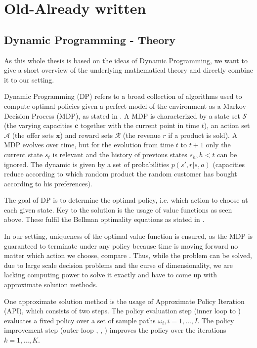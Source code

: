 \clearpage
\section{Old-Already written}

\subsection{Dynamic Programming - Theory}

As this whole thesis is based on the ideas of Dynamic Programming, we want to give a short overview of the underlying mathematical theory and directly combine it to our setting.

Dynamic Programming (DP) refers to a broad collection of algorithms used to compute optimal policies given a perfect model of the environment as a Markov Decision Process (MDP), as stated in \cite{Sutton.2018}. A MDP is characterized by a state set $\mathcal{S}$ (the varying capacities $\mathbf{c}$ together with the current point in time $t$), an action set $\mathcal{A}$ (the offer sets $\mathbf{x}$) and reward sets $\mathcal{R}$ (the revenue $r$ if a product is sold). A MDP evolves over time, but for the evolution from time $t$ to $t+1$ only the current state $s_t$ is relevant and the history of previous states $s_h, h<t$ can be ignored. The dynamic is given by a set of probabilities $p(s', r | s, a)$ (capacities reduce according to which random product the random customer has bought according to his preferences). 

The goal of DP is to determine the optimal policy, i.e. which action to choose at each given state. Key to the solution is the usage of value functions as seen above. These fulfil the Bellman optimality equations as stated in . 

In our setting, uniqueness of the optimal value function is ensured, as the MDP is guaranteed to terminate under any policy because time is moving forward no matter which action we choose, compare \cite{Sutton.2018}. Thus, while the problem can be solved, due to large scale decision problems and the curse of dimensionality, we are lacking computing power to solve it exactly and have to come up with approximate solution methods.

One approximate solution method is the usage of Approximate Policy Iteration (API), which consists of two steps. The policy evaluation step (inner loop  to ) evaluates a fixed policy over a set of sample paths $\omega_i, i = 1, \dots, I$. The policy improvement step (outer loop , , ) improves the policy over the iterations $k = 1, \dots, K$.




